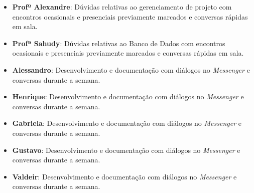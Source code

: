 \documentclass[a4paper,12pt]{article}
\begin{document}
\begin{itemize}
\item \textbf{Profº Alexandre}:
Dúvidas relativas ao gerenciamento de projeto com encontros ocasionais e presenciais previamente marcados e conversas rápidas em sala.

\item \textbf{Profª Sahudy}:
Dúvidas relativas ao Banco de Dados com encontros ocasionais e presenciais previamente marcados e conversas rápidas em sala.

\item \textbf{Alessandro}:
Desenvolvimento e documentação com diálogos no \textit{Messenger} e conversas durante a semana.

\item \textbf{Henrique}:
Desenvolvimento e documentação com diálogos no \textit{Messenger} e conversas durante a semana.

\item \textbf{Gabriela}:
Desenvolvimento e documentação com diálogos no \textit{Messenger} e conversas durante a semana.

\item \textbf{Gustavo}:
Desenvolvimento e documentação com diálogos no \textit{Messenger} e conversas durante a semana.

\item \textbf{Valdeir}:
Desenvolvimento e documentação com diálogos no \textit{Messenger} e conversas durante a semana.

\end{itemize}

\end{document}
